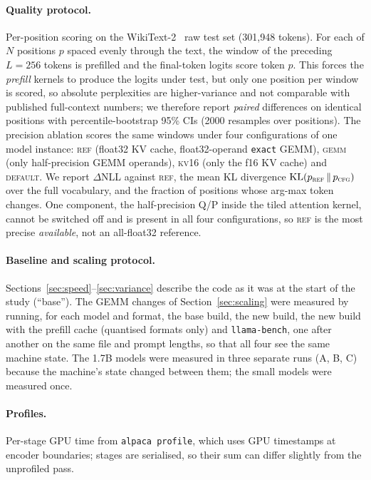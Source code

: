 \documentclass[10pt,twocolumn]{article}
\begin{document}
\paragraph{Quality protocol.} Per-position scoring on the WikiText-2~\cite{wikitext} raw test set (301{,}948 tokens). For each of $N$ positions $p$ spaced evenly through the text, the window of the preceding $L{=}256$ tokens is prefilled and the final-token logits score token $p$. This forces the \emph{prefill} kernels to produce the logits under test, but only one position per window is scored, so absolute perplexities are higher-variance and not comparable with published full-context numbers; we therefore report \emph{paired} differences on identical positions with percentile-bootstrap 95\% CIs (2000 resamples over positions). The precision ablation scores the same windows under four configurations of one model instance: \textsc{ref} (float32 KV cache, float32-operand \texttt{exact} GEMM), \textsc{gemm} (only half-precision GEMM operands), \textsc{kv16} (only the f16 KV cache) and \textsc{default}. We report $\Delta$NLL against \textsc{ref}, the mean KL divergence $\mathrm{KL}(p_{\textsc{ref}}\,\|\,p_{\textsc{cfg}})$ over the full vocabulary, and the fraction of positions whose arg-max token changes. One component, the half-precision Q/P inside the tiled attention kernel, cannot be switched off and is present in all four configurations, so \textsc{ref} is the most precise \emph{available}, not an all-float32 reference.

\paragraph{Baseline and scaling protocol.} Sections~\ref{sec:speed}--\ref{sec:variance} describe the code as it was at the start of the study (``base''). The GEMM changes of Section~\ref{sec:scaling} were measured by running, for each model and format, the base build, the new build, the new build with the prefill cache (quantised formats only) and \texttt{llama-bench}, one after another on the same file and prompt lengths, so that all four see the same machine state. The 1.7B models were measured in three separate runs (A, B, C) because the machine's state changed between them; the small models were measured once.

\paragraph{Profiles.} Per-stage GPU time from \texttt{alpaca profile}, which uses GPU timestamps at encoder boundaries; stages are serialised, so their sum can differ slightly from the unprofiled pass.
\end{document}
